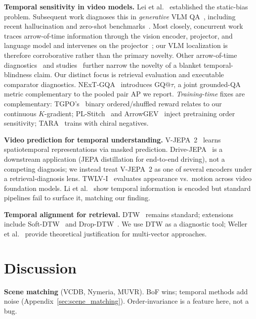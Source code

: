 \documentclass{article}
\theoremstyle{remark}
\begin{document}
\textbf{Temporal sensitivity in video models.} Lei et al.~\cite{lei2022singleframe} established the static-bias problem. Subsequent work diagnoses this in \emph{generative} VLM QA~\cite{tempcompass,bagad2023testtime,temporalbench,vbenchcomp,tomato}, including recent hallucination and zero-shot benchmarks~\cite{infact,videozerobench}. Most closely, concurrent work traces arrow-of-time information through the vision encoder, projector, and language model and intervenes on the projector~\cite{tracingaot}; our VLM localization is therefore corroborative rather than the primary novelty. Other arrow-of-time diagnostics~\cite{aot,arrowrl} and studies~\cite{timeblindness,timeblind,vitatecs,reveal,weavetime} further narrow the novelty of a blanket temporal-blindness claim. Our distinct focus is retrieval evaluation and executable comparator diagnostics. NExT-GQA~\cite{nextgqa} introduces $\mathrm{GQ}@\tau$, a joint grounded-QA metric complementary to the pooled pair AP we report. \emph{Training-time} fixes are complementary: TGPO's~\cite{tgpo} binary ordered/shuffled reward relates to our continuous $K$-gradient; PL-Stitch~\cite{plstitch} and ArrowGEV~\cite{arrowgev} inject pretraining order sensitivity; TARA~\cite{tara} trains with chiral negatives.

\textbf{Video prediction for temporal understanding.} V-JEPA~2~\cite{vjepa2} learns spatiotemporal representations via masked prediction. Drive-JEPA~\cite{drivejepa} is a downstream application (JEPA distillation for end-to-end driving), not a competing diagnosis; we instead treat V-JEPA~2 as one of several encoders under a retrieval-diagnosis lens. TWLV-I~\cite{twlvi} evaluates appearance vs.\ motion across video foundation models. Li et al.~\cite{temporaltransfer} show temporal information is encoded but standard pipelines fail to surface it, matching our finding.

\textbf{Temporal alignment for retrieval.} DTW~\cite{sakoe1978dtw} remains standard; extensions include Soft-DTW~\cite{ddtw} and Drop-DTW~\cite{dropdtw}. We use DTW as a diagnostic tool; Weller et al.~\cite{weller2025limits} provide theoretical justification for multi-vector approaches.

\section{Discussion}
\label{sec:discussion}

\textbf{Scene matching} (VCDB, Nymeria, MUVR). BoF wins; temporal methods add noise (Appendix~\ref{sec:scene_matching}). Order-invariance is a feature here, not a bug.
\end{document}
